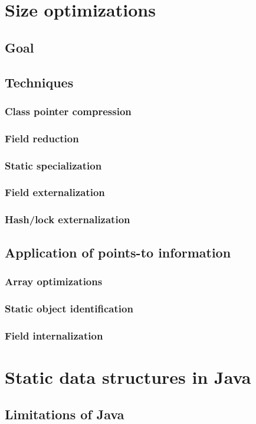 \documentclass[twoside]{article}
\begin{document}
\section{Size optimizations}
\subsection{Goal}
\subsection{Techniques}
\subsubsection{Class pointer compression}
\subsubsection{Field reduction}
\subsubsection{Static specialization}
\subsubsection{Field externalization}
\subsubsection{Hash/lock externalization}
\subsection{Application of points-to information}
\subsubsection{Array optimizations}
\subsubsection{Static object identification}
\subsubsection{Field internalization}
\section{Static data structures in Java}
\subsection{Limitations of Java}
\end{document}
